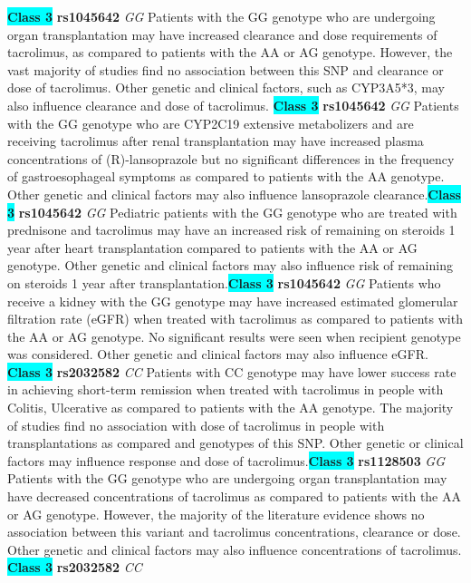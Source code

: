 \documentclass{book}
\begin{document}
\begin{center}
\textbf{\colorbox{cyan} {Class 3}} \textbf{ rs1045642 } \textit{ GG }
Patients with the GG genotype who are undergoing organ transplantation may have increased clearance and dose requirements of tacrolimus, as compared to patients with the AA or AG genotype. However, the vast majority of studies find no association between this SNP and clearance or dose of tacrolimus. Other genetic and clinical factors, such as CYP3A5*3, may also influence clearance and dose of tacrolimus. \textbf{\colorbox{cyan} {Class 3}} \textbf{ rs1045642 } \textit{ GG }
Patients with the GG genotype who are CYP2C19 extensive metabolizers and are receiving tacrolimus after renal transplantation may have increased plasma concentrations of (R)-lansoprazole but no significant differences in the frequency of gastroesophageal symptoms as compared to patients with the AA genotype. Other genetic and clinical factors may also influence lansoprazole clearance.\textbf{\colorbox{cyan} {Class 3}} \textbf{ rs1045642 } \textit{ GG }
Pediatric patients with the GG genotype who are treated with prednisone and tacrolimus may have an increased risk of remaining on steroids 1 year after heart transplantation compared to patients with the AA or AG genotype. Other genetic and clinical factors may also influence risk of remaining on steroids 1 year after transplantation.\textbf{\colorbox{cyan} {Class 3}} \textbf{ rs1045642 } \textit{ GG }
Patients who receive a kidney with the GG genotype may have increased estimated glomerular filtration rate (eGFR) when treated with tacrolimus as compared to patients with the AA or AG genotype. No significant results were seen when recipient genotype was considered. Other genetic and clinical factors may also influence eGFR. \textbf{\colorbox{cyan} {Class 3}} \textbf{ rs2032582 } \textit{ CC }
Patients with CC genotype may have lower success rate in achieving short-term remission when treated with tacrolimus in people with Colitis, Ulcerative as compared to patients with the AA genotype. The majority of studies find no association with dose of tacrolimus in people with transplantations as compared and genotypes of this SNP. Other genetic or clinical factors may influence response and dose of tacrolimus.\textbf{\colorbox{cyan} {Class 3}} \textbf{ rs1128503 } \textit{ GG }
Patients with the GG genotype who are undergoing organ transplantation may have decreased concentrations of tacrolimus as compared to patients with the AA or AG genotype. However, the majority of the literature evidence shows no association between this variant and tacrolimus concentrations, clearance or dose. Other genetic and clinical factors may also influence concentrations of tacrolimus. \textbf{\colorbox{cyan} {Class 3}} \textbf{ rs2032582 } \textit{ CC }

\end{center}
\end{document}

